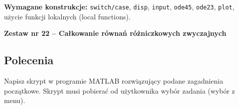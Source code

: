 \documentclass[a4paper,11pt]{article}
\begin{document}
\vspace{0.3cm}
\begin{ramka}
\textbf{Wymagane konstrukcje:}
\texttt{switch/case}, \texttt{disp}, \texttt{input}, \texttt{ode45}, \texttt{ode23}, \texttt{plot}, użycie funkcji lokalnych (local functions).
\end{ramka}

\clearpage
\begin{center}
  {\large\bfseries Zestaw nr 22 \quad -- \quad Całkowanie równań różniczkowych zwyczajnych}
\end{center}
\hrulefill
\vspace{0.4cm}

\subsection*{Polecenia}

Napisz skrypt w programie MATLAB rozwiązujący podane zagadnienia początkowe. Skrypt musi pobierać od użytkownika wybór zadania (wybór z menu).
\end{document}
